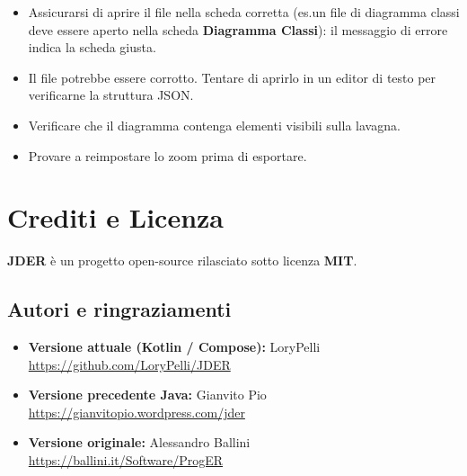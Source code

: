 \documentclass[a4paper,11pt]{article}
\newcommand{\uielement}[1]{\textbf{#1}}
\newcommand{\jder}{\textbf{JDER}}
\begin{document}
\begin{tcolorbox}[warnbox, title={Il file salvato non si apre}]
  \begin{itemize}
    \item Assicurarsi di aprire il file nella scheda corretta (es.\@ un file di diagramma classi
          deve essere aperto nella scheda \uielement{Diagramma Classi}): il messaggio di errore
          indica la scheda giusta.
    \item Il file potrebbe essere corrotto. Tentare di aprirlo in un editor di testo
          per verificarne la struttura JSON.
  \end{itemize}
\end{tcolorbox}

\begin{tcolorbox}[warnbox, title={L'esportazione PNG è vuota o incompleta}]
  \begin{itemize}
    \item Verificare che il diagramma contenga elementi visibili sulla lavagna.
    \item Provare a reimpostare lo zoom prima di esportare.
  \end{itemize}
\end{tcolorbox}

\section{Crediti e Licenza}
\label{sec:crediti}

\jder{} è un progetto open-source rilasciato sotto licenza \textbf{MIT}.

\subsection*{Autori e ringraziamenti}
\begin{itemize}
  \item \textbf{Versione attuale (Kotlin / Compose):} LoryPelli\\
        \url{https://github.com/LoryPelli/JDER}
  \item \textbf{Versione precedente Java:} Gianvito Pio\\
        \url{https://gianvitopio.wordpress.com/jder}
  \item \textbf{Versione originale:} Alessandro Ballini\\
        \url{https://ballini.it/Software/ProgER}
\end{itemize}
\end{document}
